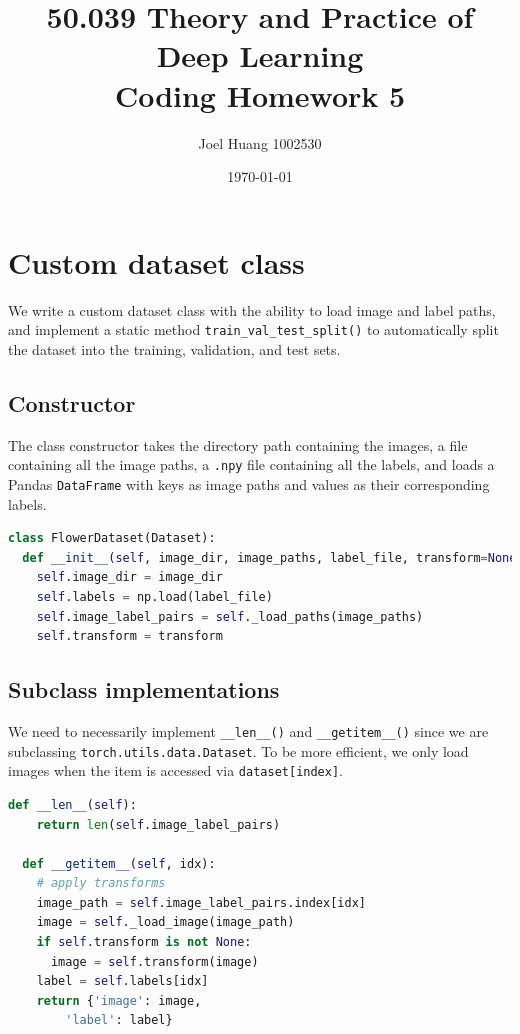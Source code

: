 \documentclass[twocolumn,9pt]{article}
\title{
	50.039 Theory and Practice of Deep Learning\\
	Coding Homework 5
}
\author{Joel Huang 1002530}
\date{\today}
\begin{document}
\maketitle
\section{Custom dataset class}
We write a custom dataset class with the ability to load image and label paths,
and implement a static method \lstinline{train_val_test_split()} to automatically
split the dataset into the training, validation, and test sets.

\subsection*{Constructor}
The class constructor takes the directory path containing the images, a file containing
all the image paths, a \lstinline{.npy} file containing all the labels, and loads a Pandas
\lstinline{DataFrame} with keys as image paths and values as their corresponding labels. 
\begin{lstlisting}[language=Python]
class FlowerDataset(Dataset):
  def __init__(self, image_dir, image_paths, label_file, transform=None):
    self.image_dir = image_dir
    self.labels = np.load(label_file)
    self.image_label_pairs = self._load_paths(image_paths)
    self.transform = transform
\end{lstlisting}

\subsection*{Subclass implementations}
We need to necessarily implement \lstinline{__len__()} and \lstinline{__getitem__()} since
we are subclassing \lstinline{torch.utils.data.Dataset}. To be more efficient, we only load
images when the item is accessed via \lstinline{dataset[index]}.
\begin{lstlisting}[language=Python]
  def __len__(self):
    return len(self.image_label_pairs)
  
  def __getitem__(self, idx):
    # apply transforms
    image_path = self.image_label_pairs.index[idx]
    image = self._load_image(image_path)
    if self.transform is not None:
      image = self.transform(image)
    label = self.labels[idx]
    return {'image': image,
        'label': label}
\end{lstlisting}
\end{document}

